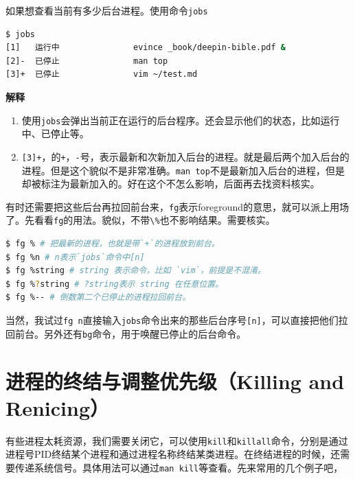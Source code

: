 \documentclass[doctor,openright,twoside]{sjtuthesis}
\providecommand{\tightlist}{%
    \setlength{\itemsep}{0pt}\setlength{\parskip}{0pt}}
\newcommand{\passthrough}[1]{#1}
\theoremstyle{plain}
\theoremstyle{definition}
\theoremstyle{remark}
\theoremstyle{ocrenumbox}
\theoremstyle{plain}
\begin{document}
如果想查看当前有多少后台进程。使用命令\passthrough{\lstinline!jobs!}

\begin{lstlisting}[language=bash]
$ jobs
[1]   运行中               evince _book/deepin-bible.pdf &
[2]-  已停止               man top
[3]+  已停止               vim ~/test.md
\end{lstlisting}

\textbf{解释}

\begin{enumerate}
\def\labelenumi{\arabic{enumi}.}
\tightlist
\item
  使用\passthrough{\lstinline!jobs!}会弹出当前正在运行的后台程序。还会显示他们的状态，比如运行中、已停止等。
\item
  \passthrough{\lstinline![3]+!}，的\passthrough{\lstinline!+!}，\passthrough{\lstinline!-!}号，表示最新和次新加入后台的进程。就是最后两个加入后台的进程。但是这个貌似不是非常准确。\passthrough{\lstinline!man top!}不是最新加入后台的进程，但是却被标注为最新加入的。好在这个不怎么影响，后面再去找资料核实。
\end{enumerate}

有时还需要把这些后台再拉回前台来，\passthrough{\lstinline!fg!}表示foreground的意思，就可以派上用场了。先看看\passthrough{\lstinline!fg!}的用法。貌似，不带\passthrough{\lstinline!\%!}也不影响结果。需要核实。

\begin{lstlisting}[language=bash]
$ fg % # 把最新的进程，也就是带`+`的进程放到前台。
$ fg %n # n表示`jobs`命令中[n]
$ fg %string # string 表示命令，比如 `vim`，前提是不混淆。
$ fg %?string # ?string表示 string 在任意位置。
$ fg %-- # 倒数第二个已停止的进程拉回前台。
\end{lstlisting}

当然，我试过\passthrough{\lstinline!fg n!}直接输入\passthrough{\lstinline!jobs!}命令出来的那些后台序号\passthrough{\lstinline![n]!}，可以直接把他们拉回前台。另外还有\passthrough{\lstinline!bg!}命令，用于唤醒已停止的后台命令。

\hypertarget{killing-and-renicing}{%
\section{进程的终结与调整优先级（Killing and
Renicing）}\label{killing-and-renicing}}

有些进程太耗资源，我们需要关闭它，可以使用\passthrough{\lstinline!kill!}和\passthrough{\lstinline!killall!}命令，分别是通过进程号PID终结某个进程和通过进程名称终结某类进程。在终结进程的时候，还需要传递系统信号。具体用法可以通过\passthrough{\lstinline!man kill!}等查看。先来常用的几个例子吧，
\end{document}
